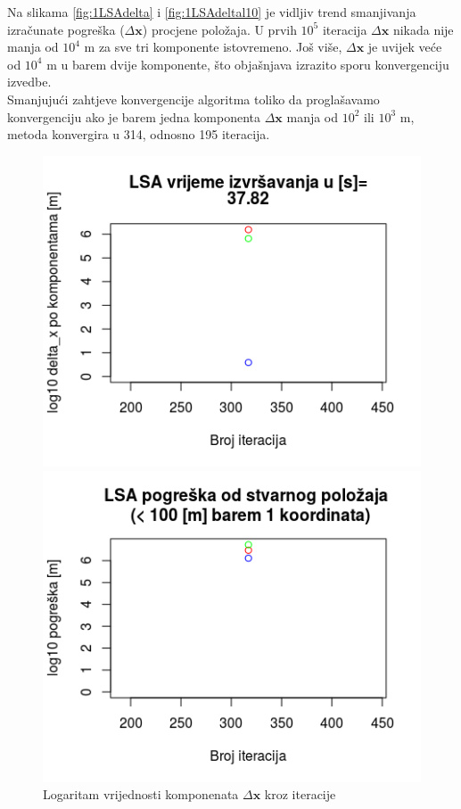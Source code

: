 \documentclass[a4paper,twoside,12pt]{memoir} %
\begin{document}
Na slikama \ref{fig:1LSAdelta} i \ref{fig:1LSAdeltal10} je vidljiv trend smanjivanja izračunate pogreška ($\Delta \mathbf{x}$)  procjene položaja.
U prvih $10^5$ iteracija $\Delta \mathbf{x}$ nikada nije manja od $10^4$ m za sve tri komponente istovremeno.
Još više, $\Delta \mathbf{x}$ je uvijek veće od $10^4$ m u barem dvije komponente, što objašnjava izrazito sporu konvergenciju izvedbe.\\
Smanjujući zahtjeve konvergencije algoritma toliko da proglašavamo konvergenciju ako je barem jedna komponenta $\Delta \mathbf{x}$ manja od $10^2$ ili $10^3$ m,
metoda konvergira u 314, odnosno 195 iteracija. 
\begin{figure}[H]
	\begin{minipage}{0.48\textwidth}
		\centering
		\includegraphics[width=1\textwidth]{1less100deltab}
		\caption{Logaritam vrijednosti komponenata $\Delta \mathbf{x}$ kroz iteracije}
		\label{fig:1less100delta}
	\end{minipage}%
	\hspace{1cm}
	\begin{minipage}{0.48\textwidth}
		\centering
		\includegraphics[width=1\textwidth]{1less100realb}

\end{minipage}
\end{figure}
\end{document}

